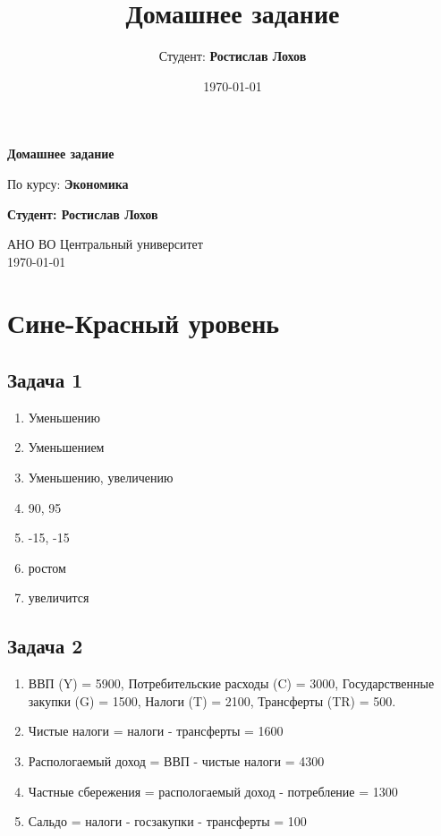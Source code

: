 \documentclass[a4paper,12pt]{article}
\title{Домашнее задание}
\author{Студент: \textbf{Ростислав Лохов}}
\date{\today}
\begin{document}
\begin{titlepage}
    \centering
    \vspace*{1cm}

    \Huge
    \textbf{Домашнее задание}

    \vspace{0.5cm}
    \LARGE
    По курсу: \textbf{Экономика}

    \vspace{1.5cm}

    \textbf{Студент: Ростислав Лохов}

    \vfill

    \Large
    АНО ВО Центральный университет\\
    \vspace{0.3cm}
    \today

\end{titlepage}

\tableofcontents
\newpage

\section{Сине-Красный уровень}

\subsection{Задача 1}
\begin{enumerate}
    \item Уменьшению
    \item Уменьшением
    \item Уменьшению, увеличению
    \item 90, 95
    \item -15, -15
    \item ростом
    \item увеличится
\end{enumerate}

\subsection{Задача 2}
\begin{enumerate}
    \item ВВП (Y) = 5900, Потребительские расходы (C) = 3000, Государственные закупки (G) = 1500, Налоги (T) = 2100, Трансферты (TR) = 500.
    \item Чистые налоги = налоги - трансферты = 1600
    \item Распологаемый доход = ВВП - чистые налоги = 4300
    \item Частные сбережения = распологаемый доход - потребление = 1300
    \item Сальдо = налоги - госзакупки - трансферты = 100
\end{enumerate}
\end{document}
